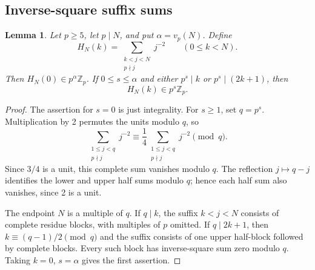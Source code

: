 \documentclass[11pt,a4paper]{article}
\newtheorem{lemma}[theorem]{Lemma}
\theoremstyle{remark}\newtheorem{remark}[theorem]{Remark}
\newcommand{\vp}{v_p}\newcommand{\Zp}{\mathbb Z_p}
\numberwithin{equation}{section}
\begin{document}
\subsection{Inverse-square suffix sums}
\begin{lemma}\label{A:suffix}
Let $p\ge5$, let $p\mid N$, and put $\alpha=\vp(N)$. Define
\[
H_N(k)=\sum_{\substack{k<j<N\\p\nmid j}}j^{-2}
\qquad(0\le k<N).
\]
Then $H_N(0)\in p^\alpha\Zp$. If $0\le s\le\alpha$ and either
$p^s\mid k$ or $p^s\mid(2k+1)$, then
\[
H_N(k)\in p^s\Zp.
\]
\end{lemma}
\begin{proof}
The assertion for $s=0$ is just integrality. For $s\ge1$, set $q=p^s$.
Multiplication by 2 permutes the units modulo $q$, so
\[
\sum_{\substack{1\le j<q\\p\nmid j}}j^{-2}
\equiv\frac14\sum_{\substack{1\le j<q\\p\nmid j}}j^{-2}\pmod q.
\]
Since $3/4$ is a unit, this complete sum vanishes modulo $q$.
The reflection $j\mapsto q-j$ identifies the lower and upper half
sums modulo $q$; hence each half sum also vanishes, since 2 is a unit.

The endpoint $N$ is a multiple of $q$. If $q\mid k$, the suffix
$k<j<N$ consists of complete residue blocks, with multiples of $p$
omitted. If $q\mid2k+1$, then $k\equiv(q-1)/2\pmod q$ and the
suffix consists of one upper half-block followed by complete blocks.
Every such block has inverse-square sum zero modulo $q$. Taking
$k=0$, $s=\alpha$ gives the first assertion.
\end{proof}
\end{document}
